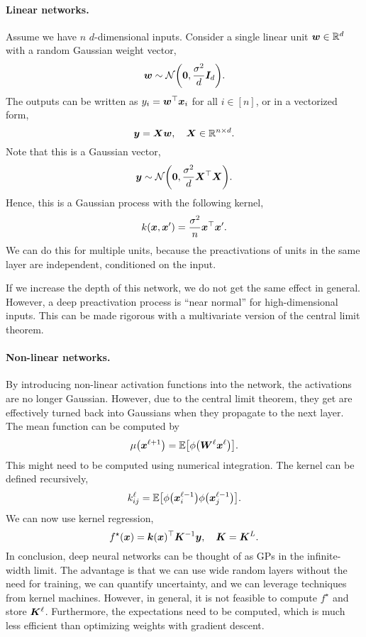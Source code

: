 \paragraph{Linear networks.}

Assume we have $n$ $d$-dimensional inputs. Consider a single linear unit $\bm{w} \in \mathbb{R}^d$ with a
random Gaussian weight vector, \[
    \vec{w} \sim \mathcal{N}\lft( \vec{0}, \frac{\sigma^2}{d} \mat{I}_d \rgt).
\]
The outputs can be written as $y_i = \bm{w}^\top \bm{x}_i$ for all $i \in [n]$, or in a
vectorized form, \[
    \bm{y} = \bm{X} \bm{w}, \quad \bm{X} \in \mathbb{R}^{n \times d}.
\]
Note that this is a Gaussian vector, \[
    \vec{y} \sim \mathcal{N}\lft( \vec{0}, \frac{\sigma^2}{d} \transpose{\mat{X}} \mat{X} \rgt).
\]
Hence, this is a Gaussian process with the following kernel, \[
    k(\bm{x}, \bm{x}') = \frac{\sigma^2}{n} \bm{x}^\top\bm{x}'.
\]
We can do this for multiple units, because the preactivations of units in the same layer are
independent, conditioned on the input.

If we increase the depth of this network, we do not get the same effect in general. However, a deep
preactivation process is ``near normal'' for high-dimensional inputs. This can be made rigorous
with a multivariate version of the central limit theorem.

\paragraph{Non-linear networks.}

By introducing non-linear activation functions into the network, the activations are no longer
Gaussian. However, due to the central limit theorem, they get are effectively turned back into
Gaussians when they propagate to the next layer. The mean function can be computed by \[
    \mu \lft( \vec{x}^{\ell+1} \rgt) = \E \lft[ \phi \lft( \mat{W}^{\ell} \vec{x}^\ell \rgt) \rgt].
\]
This might need to be computed using numerical integration. The kernel can be defined recursively, \[
    k^{\ell}_{ij} = \E \lft[ \phi\lft( \vec{x}_{i}^{\ell-1} \rgt) \phi\lft( \vec{x}_j^{\ell-1} \rgt) \rgt].
\]
We can now use kernel regression, \[
    f^\star(\bm{x}) = \bm{k}(\bm{x})^\top \bm{K}^{-1} \bm{y}, \quad \bm{K} = \bm{K}^{L}.
\]
In conclusion, deep neural networks can be thought of as GPs in the infinite-width limit. The
advantage is that we can use wide random layers without the need for training, we can quantify
uncertainty, and we can leverage techniques from kernel machines. However, in general, it is not
feasible to compute $f^\star$ and store $\bm{K}^{\ell}$. Furthermore, the expectations need to be
computed, which is much less efficient than optimizing weights with gradient descent.
